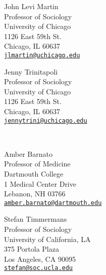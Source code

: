 \documentclass[11pt,article,oneside]{memoir}
\begin{document}
\bigskip
{}
\bigskip

\begin{minipage}[t]{0.48\textwidth}
	John Levi Martin \\
	Professor of Sociology \\
	University of Chicago \\
	1126 East 59th St. \\
	Chicago, IL 60637 \\
	\texttt{\href{mailto:jlmartin@uchicago.edu}{jlmartin@uchicago.edu}}
\end{minipage}
\hfill
\begin{minipage}[t]{0.48\textwidth}
	Jenny Trinitapoli \\
	Professor of Sociology \\
	University of Chicago \\
	1126 East 59th St. \\
	Chicago, IL 60637 \\
	\texttt{\href{mailto:jennytrini@uchicago.edu}{jennytrini@uchicago.edu}} \\
\end{minipage} \\

\bigskip

\begin{minipage}[t]{0.48\textwidth}
	Amber Barnato \\
	Professor of Medicine \\
	Dartmouth College \\
	1 Medical Center Drive \\
	Lebanon, NH 03766 \\
	\texttt{\href{mailto:amber.barnato@dartmouth.edu}{amber.barnato@dartmouth.edu}} \\
\end{minipage}
\hfill
\begin{minipage}[t]{0.48\textwidth}
	Stefan Timmermans \\
	Professor of Sociology \\
	University of California, LA \\
	375 Portola Plaza \\
	Los Angeles, CA 90095 \\
	\texttt{\href{mailto:stefan@soc.ucla.edu}{stefan@soc.ucla.edu}}
\end{minipage}
\end{document}
